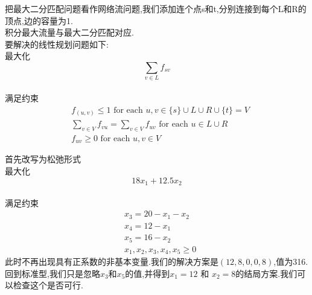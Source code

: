 \documentclass[a4paper, justified]{tufte-handout}
\begin{document}
\begin{solution}
  把最大二分匹配问题看作网络流问题,我们添加连个点s和t,分别连接到每个L和R的顶点,边的容量为1.\\
  积分最大流量与最大二分匹配对应.\\
  要解决的线性规划问题如下:\\
  最大化$$\sum_{v\in L}f_{sv}$$\\
  满足约束
  $$
    \begin{aligned}
       & f_{(u, v)} \leq 1 \text { for each } u, v \in\{s\} \cup L \cup R \cup\{t\}=V    \\
       & \sum_{v \in V} f_{v u}=\sum_{v \in V} f_{u v} \text { for each } u \in L \cup R \\
       & f_{u v} \geq 0 \text { for each } u, v \in V
    \end{aligned}
  $$
\end{solution}

\begin{problem}[TC 29.3-5]
\end{problem}

\begin{solution}
  首先改写为松弛形式\\
  最大化 $$18x_1+12.5x_2$$\\
  满足约束
  $$\begin{aligned}
       & x_3 = 20-x_1-x_2           \\
       & x_4=12-x_1                 \\
       & x_5=16-x_2                 \\
       & x_1,x_2,x_3,x_4,x_5 \geq 0
    \end{aligned}
  $$
  此时不再出现具有正系数的非基本变量.我们的解决方案是$ (12, 8, 0, 0, 8)$,值为316.\\
  回到标准型,我们只是忽略$x_3$和$x_5$的值,并得到$x_1 = 12$ 和 $x_2 = 8$的结局方案.我们可以检查这个是否可行.
\end{solution}

\begin{problem}[TC 29.4-2]
\end{problem}
\end{document}
